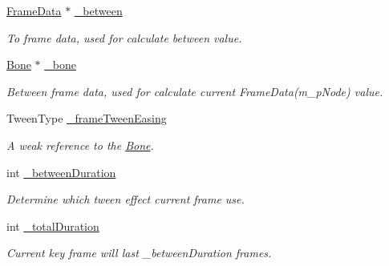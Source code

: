 \begin{DoxyCompactItemize}
\hyperlink{classcocostudio_1_1FrameData}{Frame\+Data} $\ast$ \hyperlink{classcocostudio_1_1Tween_a2dbcfc8629ffb69459d7e4228230e0c4}{\+\_\+between}
\begin{DoxyCompactList}\small\item\em To frame data, used for calculate between value. \end{DoxyCompactList}\item 
\mbox{\label{classcocostudio_1_1Tween_ac335a15c97d9fff14090c3d0ceff6927}} 
\hyperlink{classcocostudio_1_1Bone}{Bone} $\ast$ \hyperlink{classcocostudio_1_1Tween_ac335a15c97d9fff14090c3d0ceff6927}{\+\_\+bone}
\begin{DoxyCompactList}\small\item\em Between frame data, used for calculate current Frame\+Data(m\+\_\+p\+Node) value. \end{DoxyCompactList}\item 
\mbox{\label{classcocostudio_1_1Tween_a7b38dafcec018138548bb0b7ce6a8b66}} 
Tween\+Type \hyperlink{classcocostudio_1_1Tween_a7b38dafcec018138548bb0b7ce6a8b66}{\+\_\+frame\+Tween\+Easing}
\begin{DoxyCompactList}\small\item\em A weak reference to the \hyperlink{classcocostudio_1_1Bone}{Bone}. \end{DoxyCompactList}\item 
\mbox{\label{classcocostudio_1_1Tween_a90cafe7dc35872d7c29e598e922264d9}} 
int \hyperlink{classcocostudio_1_1Tween_a90cafe7dc35872d7c29e598e922264d9}{\+\_\+between\+Duration}
\begin{DoxyCompactList}\small\item\em Determine which tween effect current frame use. \end{DoxyCompactList}\item 
\mbox{\label{classcocostudio_1_1Tween_aca0213df399d5f14cf008c7f89468dd4}} 
int \hyperlink{classcocostudio_1_1Tween_aca0213df399d5f14cf008c7f89468dd4}{\+\_\+total\+Duration}
\begin{DoxyCompactList}\small\item\em Current key frame will last \+\_\+between\+Duration frames. \end{DoxyCompactList}\item 

\end{DoxyCompactItemize}
